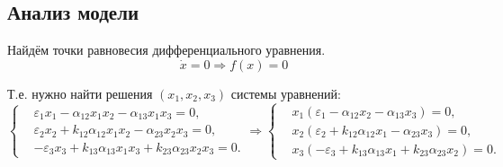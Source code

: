 \subsection{Анализ модели}
    Найдём точки равновесия дифференциального уравнения.
    \[
        \dot{x} = 0 \Rightarrow f(x) = 0
    \]

    Т.е. нужно найти решения \( (x_1, x_2, x_3) \) системы уравнений:
    \[
        \left\{\begin{split}
            & \varepsilon_1 x_1 - \alpha_{12} x_1 x_2 - \alpha_{13} x_1 x_3 = 0, \\
            & \varepsilon_2 x_2 + k_{12} \alpha_{12} x_1 x_2 - \alpha_{23} x_2 x_3 = 0, \\
            & -\varepsilon_3 x_3 + k_{13} \alpha_{13} x_1 x_3 + k_{23} \alpha_{23} x_2 x_3 = 0. 
        \end{split}\right.
        \Rightarrow
        \left\{\begin{split}
            & x_1 (\varepsilon_1 - \alpha_{12} x_2 - \alpha_{13} x_3) = 0, \\
            & x_2 (\varepsilon_2 + k_{12} \alpha_{12} x_1 - \alpha_{23} x_3) = 0, \\
            & x_3 (-\varepsilon_3 + k_{13} \alpha_{13} x_1 + k_{23} \alpha_{23} x_2) = 0. 
        \end{split}\right.
    \]

